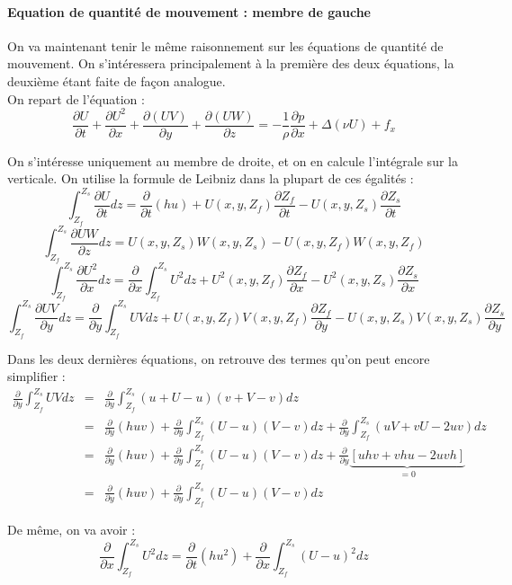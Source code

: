 \paragraph{Equation de quantité de mouvement : membre de gauche}
On va maintenant tenir le même raisonnement sur les équations de quantité de mouvement. On s'intéressera principalement à la première des deux équations, la deuxième étant faite de façon analogue.\\
On repart de l'équation :
\[\frac{\partial U}{\partial t} + \frac{\partial U^2}{\partial x} + \frac{\partial (UV)}{\partial y} +\frac{\partial (UW)}{\partial z} = -\frac{1}{\rho}\frac{\partial p}{\partial x} + \Delta(\nu U)+f_x\]

On s'intéresse uniquement au membre de droite, et on en calcule l'intégrale sur la verticale. On utilise la formule de Leibniz dans la plupart de ces égalités :
\[\int_{Z_f}^{Z_s} \frac{\partial U}{\partial t} dz = \frac{\partial}{\partial t} (hu) + U(x,y,Z_f)\frac{\partial Z_f}{\partial t} - U(x,y,Z_s) \frac{\partial Z_s}{\partial t}\]
\[\int_{Z_f}^{Z_s} \frac{\partial UW}{\partial z} dz =U(x,y,Z_s)W(x,y,Z_s)-U(x,y,Z_f)W(x,y,Z_f)\]
\[\int_{Z_f}^{Z_s} \frac{\partial U^2}{\partial x} dz = \frac{\partial}{\partial x} \int_{Z_f}^{Z_s} U^2 dz + U^2(x,y,Z_f)\frac{\partial Z_f}{\partial x} - U^2(x,y,Z_s) \frac{\partial Z_s}{\partial x}\]
\[\int_{Z_f}^{Z_s} \frac{\partial UV}{\partial y} dz = \frac{\partial}{\partial y} \int_{Z_f}^{Z_s} UV dz + U(x,y,Z_f)V(x,y,Z_f)\frac{\partial Z_f}{\partial y} - U(x,y,Z_s)V(x,y,Z_s) \frac{\partial Z_s}{\partial y}\]

\bigskip
Dans les deux dernières équations, on retrouve des termes qu'on peut encore simplifier :
\begin{eqnarray*}
	\frac{\partial}{\partial y} \int_{Z_f}^{Z_s} UV dz &=& \frac{\partial}{\partial y} \int_{Z_f}^{Z_s} (u+U-u)(v+V-v) dz \\
							&=&\frac{\partial}{\partial y} (huv) + \frac{\partial}{\partial y} \int_{Z_f}^{Z_s} (U-u)(V-v) dz + \frac{\partial}{\partial y} \int_{Z_f}^{Z_s} (uV+vU-2uv) dz \\
							&=&\frac{\partial}{\partial y} (huv) + \frac{\partial}{\partial y} \int_{Z_f}^{Z_s} (U-u)(V-v) dz + \frac{\partial}{\partial y} \underbrace{\left[ uhv + vhu - 2uvh \right]}_{=0} \\
							&=& \frac{\partial}{\partial y} (huv) + \frac{\partial}{\partial y} \int_{Z_f}^{Z_s} (U-u)(V-v) dz
\end{eqnarray*}

De même, on va avoir :
\[\frac{\partial}{\partial x} \int_{Z_f}^{Z_s} U^2 dz= \frac{\partial}{\partial t} (hu^2) + \frac{\partial}{\partial x} \int_{Z_f}^{Z_s} (U-u)^2 dz\]

